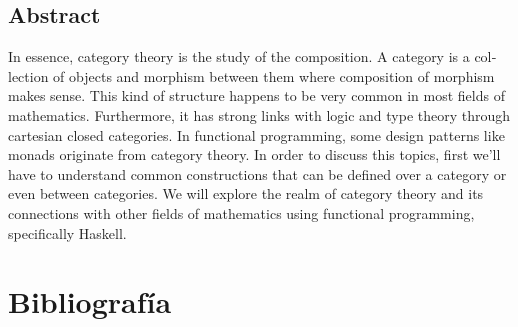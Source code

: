 \documentclass[\OPTfontsize, twoside]{book}
\begin{document}
\section*{Abstract}
\begin{otherlanguage}{english}
    In essence, category theory is the study of the composition.
    A category is a collection of objects and morphism between them where composition of morphism makes sense.
    This kind of structure happens to be very common in most fields of mathematics.
    Furthermore, it has strong links with logic and type theory through cartesian closed categories.
    In functional programming, some design patterns like monads originate from category theory.
    In order to discuss this topics, first we'll have to understand common constructions that can be defined over a category or even between categories. 
    We will explore the realm of category theory and its connections with other fields of mathematics using functional programming, specifically Haskell.
\end{otherlanguage}










\backmatter

\chapter*{Bibliografía}
%
%
\end{document}
